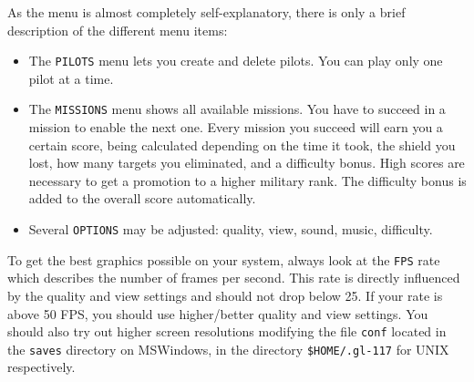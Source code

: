 As the menu is almost completely self-explanatory, there is only a brief
description of the different menu items:
\begin{itemize}
\item{The \texttt{PILOTS} menu lets you create and delete pilots. You can
play only one pilot at a time.}
\item{The \texttt{MISSIONS} menu shows all available missions. You have to
succeed in a mission to enable the next one.
Every mission you succeed will earn you a certain score, being calculated
depending on the time it took, the shield you lost, how many targets you
eliminated, and a difficulty bonus.
High scores are necessary to get a promotion to a higher military rank.
The difficulty bonus is added to the overall score automatically.}
\item{Several \texttt{OPTIONS} may be adjusted: quality, view, sound, music,
difficulty.}
\end{itemize}

To get the best graphics possible on your system, always look at the
\texttt{FPS} rate which describes the number of frames per second.
This rate is directly influenced by the quality and view settings and
should not drop below 25. If your rate is above 50 FPS, you should
use higher/better quality and view settings.
You should also try out higher screen resolutions modifying the file
\texttt{conf} located in the \texttt{saves}
directory on MSWindows, in the directory \texttt{\$HOME/.gl-117} for UNIX respectively.
